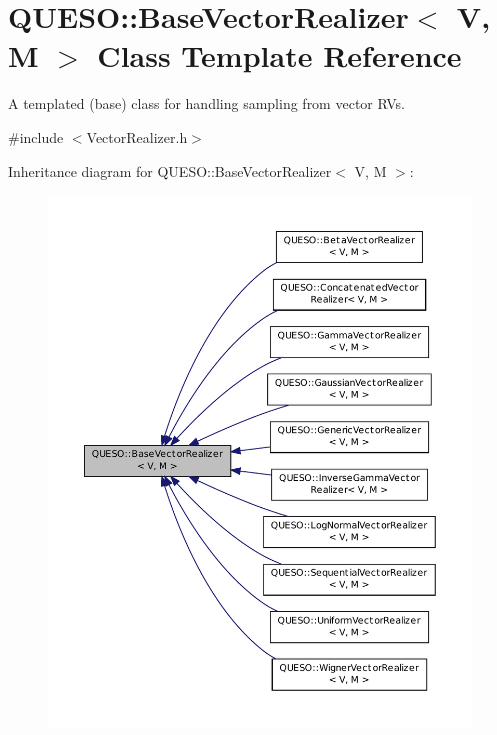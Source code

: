 \hypertarget{class_q_u_e_s_o_1_1_base_vector_realizer}{\section{Q\-U\-E\-S\-O\-:\-:Base\-Vector\-Realizer$<$ V, M $>$ Class Template Reference}
\label{class_q_u_e_s_o_1_1_base_vector_realizer}
}


A templated (base) class for handling sampling from vector R\-Vs.  




{\ttfamily \#include $<$Vector\-Realizer.\-h$>$}



Inheritance diagram for Q\-U\-E\-S\-O\-:\-:Base\-Vector\-Realizer$<$ V, M $>$\-:
\nopagebreak
\begin{figure}[H]
\begin{center}
\leavevmode
\includegraphics[width=350pt]{class_q_u_e_s_o_1_1_base_vector_realizer__inherit__graph}
\end{center}
\end{figure}



